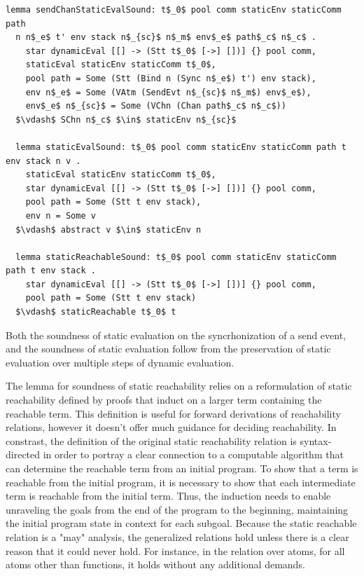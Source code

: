 \documentclass[letterpaper, 11pt]{report}
\begin{document}
\begin{lstlisting}[language=logic, mathescape]
  lemma sendChanStaticEvalSound: t$_0$ pool comm staticEnv staticComm path
  n n$_e$ t' env stack n$_{sc}$ n$_m$ env$_e$ path$_c$ n$_c$ .
    star dynamicEval [[] -> (Stt t$_0$ [->] [])] {} pool comm,
    staticEval staticEnv staticComm t$_0$,
    pool path = Some (Stt (Bind n (Sync n$_e$) t') env stack),
    env n$_e$ = Some (VAtm (SendEvt n$_{sc}$ n$_m$) env$_e$),
    env$_e$ n$_{sc}$ = Some (VChn (Chan path$_c$ n$_c$))
  $\vdash$ SChn n$_c$ $\in$ staticEnv n$_{sc}$

  lemma staticEvalSound: t$_0$ pool comm staticEnv staticComm path t env stack n v .
    staticEval staticEnv staticComm t$_0$, 
    star dynamicEval [[] -> (Stt t$_0$ [->] [])] {} pool comm,
    pool path = Some (Stt t env stack), 
    env n = Some v
  $\vdash$ abstract v $\in$ staticEnv n 

  lemma staticReachableSound: t$_0$ pool comm staticEnv staticComm path t env stack .
    star dynamicEval [[] -> (Stt t$_0$ [->] [])] {} pool comm,
    pool path = Some (Stt t env stack)
  $\vdash$ staticReachable t$_0$ t 
\end{lstlisting}

Both the soundness of static evaluation on the syncrhonization of a send event,
and the soundness of static evaluation follow from
the preservation of static evaluation over multiple steps of dynamic evaluation.

The lemma for soundness of static reachability relies on a reformulation of
static reachability defined by proofs that induct on a larger term
containing the reachable term. This definition is useful for forward derivations
of reachability relations, however it doesn't offer much guidance for deciding reachability. 
In constrast, the definition of the original static reachability relation is
syntax-directed in order to portray a clear connection to
a computable algorithm that can determine the reachable term from an initial program.
To show that a term is reachable from the initial program, it is necessary to
show that each intermediate term is reachable from the initial term. Thus, the
induction needs to enable unraveling the goals from the end of the program to the beginning,
maintaining the initial program state in context for each subgoal. Because the static
reachable relation is a "may" analysis, the generalized relations hold unless there is
a clear reason that it could never hold.
For instance, in the relation over atoms, for all atoms other than functions, 
it holds without any additional demands.
\end{document}
